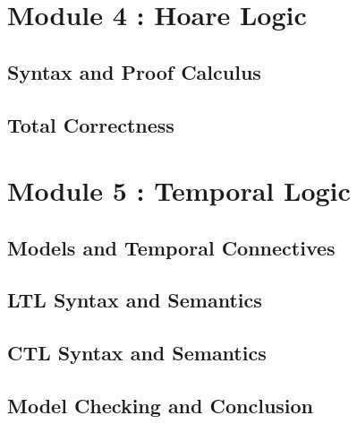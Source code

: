 \documentclass[4pt, aspectratio=169]{beamer} %
\begin{document}
\section{Module 4 : Hoare Logic}

{
 
}
\subsection{Syntax and Proof Calculus}
{
 
}
\subsection{Total Correctness}
{
 
}
\section{Module 5 : Temporal Logic}

{
 
}
\subsection{Models and Temporal Connectives}
{
 
}
\subsection{LTL Syntax and Semantics}
{
 
}
\subsection{CTL Syntax and Semantics}
{
 
}
\subsection{Model Checking and Conclusion}
{
 

}
\end{document}
